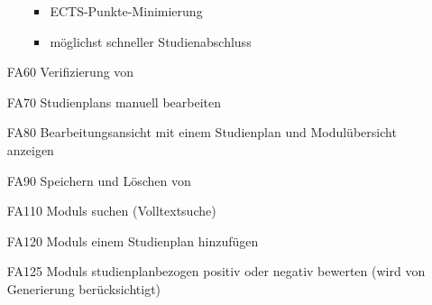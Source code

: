 \begin{itemize}[nosep]
\begin{itemize}[nosep]
				\begin{itemize}[nosep]
					\item \gls{ECTS-Punkte}-Minimierung
					\item möglichst schneller Studienabschluss
				\end{itemize}
			\end{itemize}
		\item [FA60] \gls{Verifizierung} von 
		\item [FA70] \glspl{Studienplan} manuell bearbeiten
		\item[FA80] Bearbeitungsansicht mit einem \gls{Studienplan} und Modulübersicht anzeigen  
		\item [FA90]Speichern und Löschen von 	
		\item[FA110] \glspl{Modul} suchen (Volltextsuche)
		\item[FA120] \glspl{Modul} einem \gls{Studienplan} hinzufügen
		\item[FA125] \glspl{Modul} studienplanbezogen positiv oder negativ bewerten (wird von \gls{Generierung} berücksichtigt)
		\end{itemize}
